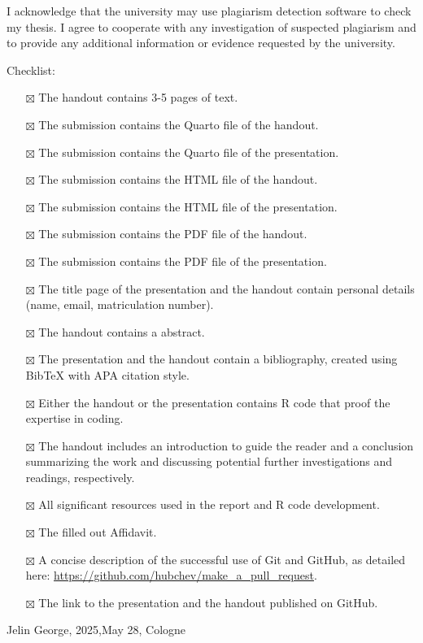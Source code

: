 \documentclass[
  man,
  floatsintext,
  longtable,
  nolmodern,
  notxfonts,
  notimes,
  colorlinks=true,linkcolor=blue,citecolor=blue,urlcolor=blue]{apa7}
\providecommand{\tightlist}{%
  \setlength{\itemsep}{0pt}\setlength{\parskip}{0pt}}
\begin{document}
I acknowledge that the university may use plagiarism detection software
to check my thesis. I agree to cooperate with any investigation of
suspected plagiarism and to provide any additional information or
evidence requested by the university.

Checklist:

\begin{itemize}
\tightlist
\item[$\boxtimes$]
  The handout contains 3-5 pages of text.
\item[$\boxtimes$]
  The submission contains the Quarto file of the handout.
\item[$\boxtimes$]
  The submission contains the Quarto file of the presentation.
\item[$\boxtimes$]
  The submission contains the HTML file of the handout.
\item[$\boxtimes$]
  The submission contains the HTML file of the presentation.
\item[$\boxtimes$]
  The submission contains the PDF file of the handout.
\item[$\boxtimes$]
  The submission contains the PDF file of the presentation.
\item[$\boxtimes$]
  The title page of the presentation and the handout contain personal
  details (name, email, matriculation number).
\item[$\boxtimes$]
  The handout contains a abstract.
\item[$\boxtimes$]
  The presentation and the handout contain a bibliography, created using
  BibTeX with APA citation style.
\item[$\boxtimes$]
  Either the handout or the presentation contains R code that proof the
  expertise in coding.
\item[$\boxtimes$]
  The handout includes an introduction to guide the reader and a
  conclusion summarizing the work and discussing potential further
  investigations and readings, respectively.
\item[$\boxtimes$]
  All significant resources used in the report and R code development.
\item[$\boxtimes$]
  The filled out Affidavit.
\item[$\boxtimes$]
  A concise description of the successful use of Git and GitHub, as
  detailed here: \url{https://github.com/hubchev/make_a_pull_request}.
\item[$\boxtimes$]
  The link to the presentation and the handout published on GitHub.
\end{itemize}

Jelin George, 2025,May 28, Cologne
\end{document}
